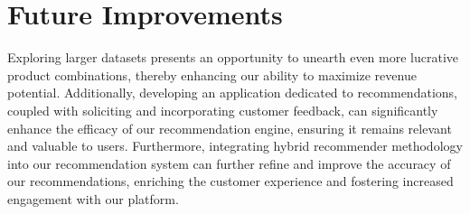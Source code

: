 \documentclass[11pt]{article} %
\begin{document}
\section{Future Improvements}
Exploring larger datasets presents an opportunity to unearth even more lucrative product combinations, thereby enhancing our ability to maximize revenue potential. Additionally, developing an application dedicated to recommendations, coupled with soliciting and incorporating customer feedback, can significantly enhance the efficacy of our recommendation engine, ensuring it remains relevant and valuable to users. Furthermore, integrating hybrid recommender methodology into our recommendation system can further refine and improve the accuracy of our recommendations, enriching the customer experience and fostering increased engagement with our platform.
\end{document}
